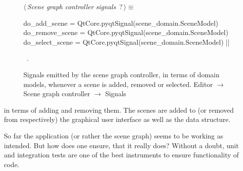 \documentclass[%
    a4paper,    %
    justified,  %
    nobib,      %
    openany     %
]{tufte-book}
\makeatletter
\renewcommand{\label}[1]{\@tufte@label{##1}}%
\makeatother
\begin{document}
\begin{figure}
\begin{flushleft} \small
\begin{minipage}{\linewidth}\label{scrap54}\raggedright\small
{} $\langle\,${\itshape Scene graph controller signals}\nobreak\ {\footnotesize {?}}$\,\rangle\equiv$
\vspace{-1ex}
\begin{pythoncode}
do_add_scene    = QtCore.pyqtSignal(scene_domain.SceneModel)
do_remove_scene = QtCore.pyqtSignal(scene_domain.SceneModel)
do_select_scene = QtCore.pyqtSignal(scene_domain.SceneModel)
|\NWsep|
\end{pythoncode}
\vspace{1.5ex}
\footnotesize
\begin{list}{}{\setlength{\itemsep}{-\parsep}\setlength{\itemindent}{-\leftmargin}}
\item \NWtxtMacroRefIn\ .

\item{}
\end{list}
\end{minipage}\vspace{4ex}
\end{flushleft}
\caption{Signals emitted by the scene graph controller, in terms of domain
  models, whenever a scene is added, removed or selected.
  \newline{}\newline{}Editor $\rightarrow$ Scene graph controller
  $\rightarrow$ Signals}
\label{editor:lst:scene-graph-controller:signals}
\end{figure}


 in terms of adding
and removing them. The scenes are added to (or removed from respectively) the
graphical user interface as well as the data structure.

So far the application (or rather the scene graph) seems to be working as
intended. But how does one ensure, that it really does? Without a doubt, unit
and integration tests are one of the best instruments to ensure functionality of
code.
\end{document}
